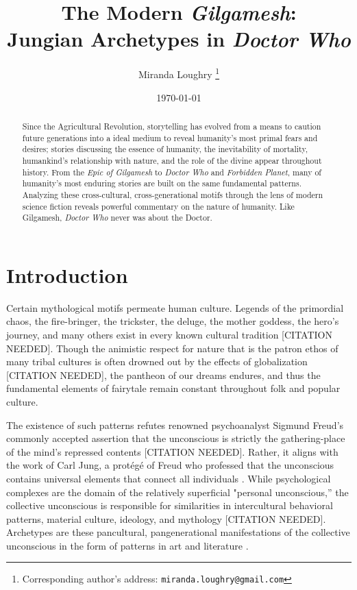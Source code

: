 \documentclass[10pt,a4paper]{article}
\begin{document}
\title{The Modern \emph{Gilgamesh}: \\
Jungian Archetypes in \emph{Doctor Who}}

\author{Miranda Loughry%
\thanks{Corresponding author's address: \texttt{miranda.loughry@gmail.com}}}

\date{\today}

\maketitle

\begin{abstract}
Since the Agricultural Revolution, storytelling has evolved from a means to caution future generations into a ideal medium to reveal humanity's most primal fears and desires; stories discussing the essence of humanity, the inevitability of mortality, humankind's relationship with nature, and the role of the divine appear throughout history. From the \emph{Epic of Gilgamesh} to \emph{Doctor Who} and \emph{Forbidden Planet}, many of humanity's most enduring stories are built on the same fundamental patterns. Analyzing these cross-cultural, cross-generational motifs through the lens of modern science fiction reveals powerful commentary on the nature of humanity. Like Gilgamesh, \emph{Doctor Who} never was about the Doctor.
\end{abstract}

\section{Introduction}
%
%

Certain mythological motifs permeate human culture. Legends of the primordial chaos, the fire-bringer, the trickster, the deluge, the mother goddess, the hero’s journey, and many others exist in every known cultural tradition [CITATION NEEDED]. Though the animistic respect for nature that is the patron ethos of many tribal cultures is often drowned out by the effects of globalization [CITATION NEEDED], the pantheon of our dreams endures, and thus the fundamental elements of fairytale remain constant throughout folk and popular culture.

The existence of such patterns refutes renowned psychoanalyst Sigmund Freud’s commonly accepted assertion that the unconscious is strictly the gathering-place of the mind’s repressed contents [CITATION NEEDED]. Rather, it aligns with the work of Carl Jung, a protégé of Freud who professed that the unconscious contains universal elements that connect all individuals \cite{jung2014archetypes}. While psychological complexes are the domain of the relatively superficial "personal unconscious,” the collective unconscious is responsible for similarities in intercultural behavioral patterns, material culture, ideology, and mythology [CITATION NEEDED]. Archetypes are these pancultural, pangenerational manifestations of the collective unconscious in the form of patterns in art and literature  \cite{jung2014archetypes}.
\end{document}
